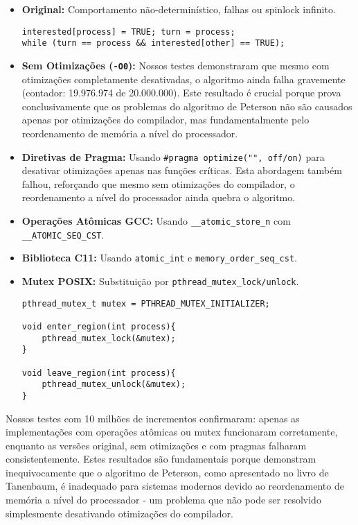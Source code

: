 \documentclass[10pt]{article}
\begin{document}
\begin{itemize}
\item \textbf{Original:} Comportamento não-determinístico, falhas ou spinlock infinito.
\begin{lstlisting}
interested[process] = TRUE; turn = process;
while (turn == process && interested[other] == TRUE);
\end{lstlisting}

\item \textbf{Sem Otimizações (\texttt{-O0}):} Nossos testes demonstraram que mesmo com otimizações completamente desativadas, o algoritmo ainda falha gravemente (contador: 19.976.974 de 20.000.000). Este resultado é crucial porque prova conclusivamente que os problemas do algoritmo de Peterson não são causados apenas por otimizações do compilador, mas fundamentalmente pelo reordenamento de memória a nível do processador.

\item \textbf{Diretivas de Pragma:} Usando \texttt{\#pragma optimize("", off/on)} para desativar otimizações apenas nas funções críticas. Esta abordagem também falhou, reforçando que mesmo sem otimizações do compilador, o reordenamento a nível do processador ainda quebra o algoritmo.

\item \textbf{Operações Atômicas GCC:} Usando \texttt{\_\_atomic\_store\_n} com \texttt{\_\_ATOMIC\_SEQ\_CST}.

\item \textbf{Biblioteca C11:} Usando \texttt{atomic\_int} e \texttt{memory\_order\_seq\_cst}.

\item \textbf{Mutex POSIX:} Substituição por \texttt{pthread\_mutex\_lock/unlock}.
\begin{lstlisting}
pthread_mutex_t mutex = PTHREAD_MUTEX_INITIALIZER;

void enter_region(int process){
    pthread_mutex_lock(&mutex);
}

void leave_region(int process){
    pthread_mutex_unlock(&mutex);
}
\end{lstlisting}
\end{itemize}

Nossos testes com 10 milhões de incrementos confirmaram: apenas as implementações com operações atômicas ou mutex funcionaram corretamente, enquanto as versões original, sem otimizações e com pragmas falharam consistentemente. Estes resultados são fundamentais porque demonstram inequivocamente que o algoritmo de Peterson, como apresentado no livro de Tanenbaum, é inadequado para sistemas modernos devido ao reordenamento de memória a nível do processador - um problema que não pode ser resolvido simplesmente desativando otimizações do compilador.
\end{document}
